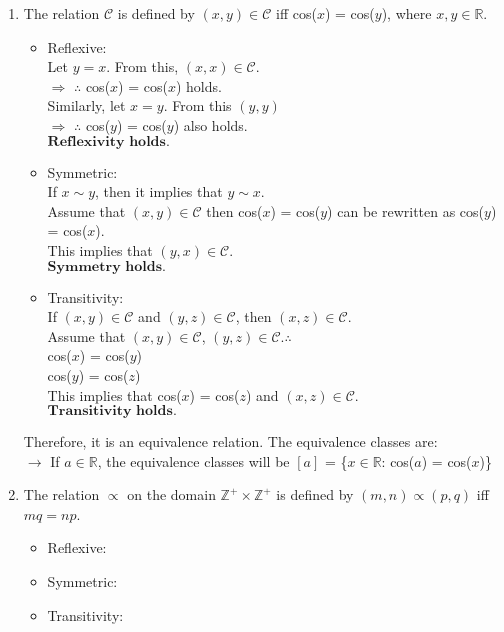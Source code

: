 \documentclass{article}
\newcommand{\R}{\mathbb{R}}
\newcommand{\Z}{\mathbb{Z}}
\begin{document}
\begin{enumerate}
\begin{enumerate}
    \item The relation $\mathcal{C}$ is defined by $(x,y)\in \mathcal{C}$ iff cos($x$) = cos($y$), 
    where $x,y \in \R$.
    \begin{itemize}
        \item Reflexive:\\ Let $y = x$. From this, $(x,x) \in \mathcal{C}$.\\ 
        $\Rightarrow$ $\therefore$ cos($x$) = cos($x$) holds.\\
        Similarly, let $x = y$. From this $(y,y)$\\ 
        $\Rightarrow$ $\therefore$ cos($y$) = cos($y$) also holds.\\$\textbf{Reflexivity holds.}$\\

        \item Symmetric:\\If $x \sim y$, then it implies that $y \sim x$.\\Assume that $(x,y) \in 
        \mathcal{C}$ then cos($x$) = cos($y$) can be rewritten as cos($y$) = cos($x$).\\This implies 
        that $(y,x) \in \mathcal{C}$.\\$\textbf{Symmetry holds.}$\\ 

        \item Transitivity:\\If $(x,y) \in \mathcal{C}$ and $(y,z) \in \mathcal{C}$, then $(x,z) \in \mathcal{C}$.\\
        Assume that $(x,y) \in \mathcal{C}$, $(y,z) \in \mathcal{C}$.$\therefore$\\
        cos($x$) = cos($y$)\\
        cos($y$) = cos($z$)\\
        This implies that cos($x$) = cos($z$) and $(x,z) \in \mathcal{C}$.\\$\textbf{Transitivity holds.}$\\
    \end{itemize}
    Therefore, it is an equivalence relation. The equivalence classes are:\\
    $\rightarrow$ If $a \in \R$, the equivalence classes will be $[a]$ = \{$x \in \R$: cos($a$) = cos($x$)\}\\
    \item The relation $\varpropto$ on the domain $\Z^+\times\Z^+$ is defined by $(m,n) \varpropto (p,q)$ iff $mq = np$.
    \begin{itemize}
        \item Reflexive:\\ 
        \item Symmetric:\\
        \item Transitivity:\\
    \end{itemize}
\end{enumerate}

\end{enumerate}
\end{document}
